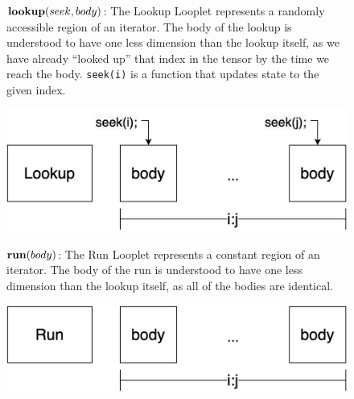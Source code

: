 \begin{figure}[ht]
    \footnotesize
    \begin{minipage}[c]{0.65\linewidth}
        $\text{\textbf{lookup}}(seek, body)$: The Lookup Looplet represents a
        randomly accessible region of an iterator. The body of the lookup is
        understood to have one less dimension than the lookup itself, as we have
        already ``looked up'' that index in the tensor by the time we reach the
        body. \texttt{seek(i)} is a function that updates state to the given
        index.
    \end{minipage}%
    \begin{minipage}[c]{0.35\linewidth}
        \centering
        \includegraphics[scale=0.20]{Looplets-lookup.png}
    \end{minipage}
    \vspace{3pt}

    \begin{minipage}[c]{0.65\linewidth}
        $\text{\textbf{run}}(body)$: The Run Looplet represents a constant
        region of an iterator. The body of the run is understood to have one
        less dimension than the lookup itself, as all of the bodies are
        identical.
    \end{minipage}%
    \begin{minipage}[c]{0.35\linewidth}
        \centering
        \includegraphics[scale=0.20]{Looplets-run.png}
    \end{minipage}
    \vspace{3pt}


\end{figure}
